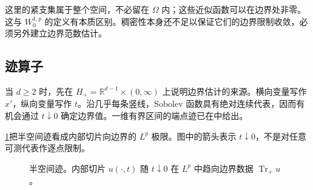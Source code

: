 这里的紧支集属于整个空间，不必留在 \(\Omega\) 内；这些近似函数可以在边界处非零。这与 \(W_0^{1,p}\) 的定义有本质区别。稠密性本身还不足以保证它们的边界限制收敛，必须另外建立边界范数估计。

\subsection{迹算子}
\label{b1:subsec:230102}

当 \(d\ge2\) 时，先在 \(H_+=\mathbb R^{d-1}\times(0,\infty)\) 上说明边界估计的来源。横向变量写作 \(x'\)，纵向变量写作 \(t\)。沿几乎每条竖线，Sobolev 函数具有绝对连续代表，因而有机会通过 \(t\downarrow0\) 确定边界值。一维有界区间的端点迹已在中给出。

\ProseParagraphBreak

\cref{b1:fig:half-space-trace}把半空间迹看成内部切片向边界的 \(L^p\) 极限。图中的箭头表示 \(t\downarrow0\)，不是对任意可测代表作逐点限制。
\begin{figure}[htbp]
  \centering
  \caption[半空间迹]{半空间迹。内部切片 \(u(\cdot,t)\) 随 \(t\downarrow0\) 在 \(L^p\) 中趋向边界数据 \(\operatorname{Tr}_+u\)。}
  \label{b1:fig:half-space-trace}
\end{figure}

